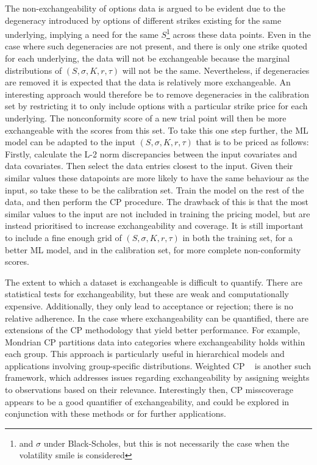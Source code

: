 \documentclass{article}
\theoremstyle{definition}
\begin{document}
The non-exchangeability of options data is argued to be evident due to the degeneracy introduced by options of different strikes existing for the same underlying, implying a need for the same $S$\footnote{and $\sigma$ under Black-Scholes, but this is not necessarily the case when the volatility smile is considered} across these data points. Even in the case where such degeneracies are not present, and there is only one strike quoted for each underlying, the data will not be exchangeable because the marginal distributions of $(S, \sigma, K, r, \tau)$ will not be the same. Nevertheless, if degeneracies are removed it is expected that the data is relatively more exchangeable. An interesting approach would therefore be to remove degeneracies in the calibration set by restricting it to only include options with a particular strike price for each underlying. The nonconformity score of a new trial point will then be more exchangeable with the scores from this set. To take this one step further, the ML model can be adapted to the input $(S, \sigma, K, r, \tau)$ that is to be priced as follows: Firstly, calculate the L-2 norm discrepancies between the input covariates and data covariates. Then select the data entries closest to the input. Given their similar values these datapoints are more likely to have the same behaviour as the input, so take these to be the calibration set. Train the model on the rest of the data, and then perform the CP procedure. The drawback of this is that the most similar values to the input are not included in training the pricing model, but are instead prioritised to increase exchangeability and coverage. It is still important to include a fine enough grid of $(S, \sigma, K, r, \tau)$ in both the training set, for a better ML model, and in the calibration set, for more complete non-conformity scores.

The extent to which a dataset is exchangeable is difficult to quantify. There are statistical tests for exchangeability, but these are weak and computationally expensive. Additionally, they only lead to acceptance or rejection; there is no relative adherence. In the case where exchangeability can be quantified, there are extensions of the CP methodology that yield better performance. For example, Mondrian CP \cite{vovk2005} partitions data into categories where exchangeability holds within each group. This approach is particularly useful in hierarchical models and applications involving group-specific distributions. Weighted CP ~\cite{beyond_exchange} is another such framework, which addresses issues regarding exchangeability by assigning weights to observations based on their relevance. Interestingly then, CP misscoverage appears to be a good quantifier of exchangeability, and could be explored in conjunction with these methods or for further applications.
\end{document}
